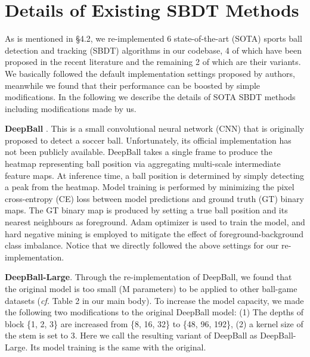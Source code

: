 \documentclass{bmvc2k}
\begin{document}
\section{Details of Existing SBDT Methods}
\label{appendix:imple}
As is mentioned in \S 4.2, we re-implemented 6 state-of-the-art (SOTA) sports ball detection and tracking (SBDT) algorithms in our codebase, 4 of which have been proposed in the recent literature \cite{komorowski+2019mva,komorowski+2020visapp,zandycke+2019mmsports,sun+2020icpai,liu+2022cvprw} and the remaining 2 of which are their variants.
We basically followed the default implementation settings proposed by authors, meanwhile we found that their performance can be boosted by simple modifications.
In the following we describe the details of SOTA SBDT methods including modifications made by us.
\par
\vspace{1mm}
\noindent \textbf{DeepBall} \cite{komorowski+2019mva,komorowski+2020visapp}. This is a small convolutional neural network (CNN) that is originally proposed to detect a soccer ball.
Unfortunately, its official implementation has not been publicly available.
DeepBall takes a single frame to produce the heatmap representing ball position via aggregating multi-scale intermediate feature maps.
At inference time, a ball position is determined by simply detecting a peak from the heatmap.
Model training is performed by minimizing the pixel cross-entropy (CE) loss between model predictions and ground truth (GT) binary maps.
The GT binary map is produced by setting a true ball position and its nearest neighbours as foreground.
Adam optimizer \cite{kingma+2015iclr} is used to train the model, and hard negative mining \cite{liu+2016eccv} is employed to mitigate the effect of foreground-background class imbalance.
Notice that we directly followed the above settings for our re-implementation.
\par
\vspace{1mm}
\noindent \textbf{DeepBall-Large}.
Through the re-implementation of DeepBall, we found that the original model is too small (M parameters) to be applied to other ball-game datasets ({\it cf.} Table 2 in our main body).
To increase the model capacity, we made the following two modifications to the original DeepBall model: (1) The depths of block \{1, 2, 3\} are increased from \{8, 16, 32\} to \{48, 96, 192\}, (2) a kernel size of the stem is set to 3.
Here we call the resulting variant of DeepBall as DeepBall-Large.
Its model training is the same with the original.
\par
\end{document}
